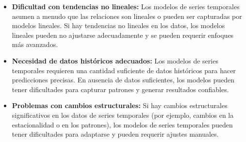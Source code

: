 \begin{itemize}
\begin{itemize}
        \item \textbf{Dificultad con tendencias no lineales:} Los modelos de series temporales asumen a menudo que las relaciones son lineales o pueden ser capturadas por modelos lineales. Si hay tendencias no lineales en los datos, los modelos lineales pueden no ajustarse adecuadamente y se pueden requerir enfoques más avanzados.
        \item \textbf{Necesidad de datos históricos adecuados:} Los modelos de series temporales requieren una cantidad suficiente de datos históricos para hacer predicciones precisas. En ausencia de datos suficientes, los modelos pueden tener dificultades para capturar patrones y generar resultados confiables.
        \item \textbf{Problemas con cambios estructurales:} Si hay cambios estructurales significativos en los datos de series temporales (por ejemplo, cambios en la estacionalidad o en los patrones), los modelos de series temporales pueden tener dificultades para adaptarse y pueden requerir ajustes manuales.
    \end{itemize}
\end{itemize}